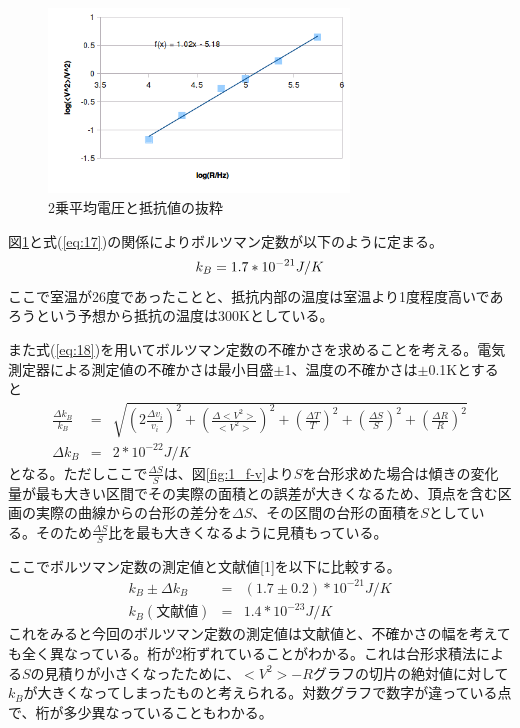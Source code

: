\documentclass[11pt,a4j]{jsarticle}
\begin{document}
   \begin{figure}[htbp]
  \centering
  \includegraphics[width=8cm,clip]{2_after.png}
  \caption{2乗平均電圧と抵抗値の抜粋}
  \label{fig:2_after}
 \end{figure}%
   
   図\ref{fig:2_after}と式(\ref{eq:17})の関係によりボルツマン定数が以下のように定まる。
   \begin{equation}
   k_B = 1.7 * 10^{-21} J/K \nonumber \\
   \end{equation}
   ここで室温が26度であったことと、抵抗内部の温度は室温より1度程度高いであろうという予想から抵抗の温度は300Kとしている。
   
   また式(\ref{eq:18})を用いてボルツマン定数の不確かさを求めることを考える。電気測定器による測定値の不確かさは最小目盛$\pm$1、温度の不確かさは$\pm$0.1Kとすると
   \begin{eqnarray}
   \frac{\Delta k_B}{k_B} &=& \sqrt{(2\frac{\Delta v_i}{v_i})^2 + (\frac{\Delta <V^2>}{<V^2>})^2 + (\frac{\Delta T}{T})^2 + (\frac{\Delta S}{S})^2 + (\frac{\Delta R}{R})^2} \nonumber \\
   \Delta k_B &=& 2 * 10^{-22} J/K \nonumber
   \end{eqnarray}
   となる。ただしここで$\frac{\Delta S}{S}$は、図\ref{fig:1_f-v}より$S$を台形求めた場合は傾きの変化量が最も大きい区間でその実際の面積との誤差が大きくなるため、頂点を含む区画の実際の曲線からの台形の差分を$\Delta S$、その区間の台形の面積を$S$としている。そのため$\frac{\Delta S}{S}$比を最も大きくなるように見積もっている。
   
   ここでボルツマン定数の測定値と文献値[1]を以下に比較する。
   \begin{eqnarray}
   k_B \pm \Delta k_B &=& (1.7 \pm 0.2) * 10^{-21} J/K \nonumber \\
   k_B(文献値) &=& 1.4 * 10^{-23} J/K \nonumber
   \end{eqnarray}
   これをみると今回のボルツマン定数の測定値は文献値と、不確かさの幅を考えても全く異なっている。桁が2桁ずれていることがわかる。これは台形求積法による$S$の見積りが小さくなったために、$<V^2> - R$グラフの切片の絶対値に対して$k_B$が大きくなってしまったものと考えられる。対数グラフで数字が違っている点で、桁が多少異なっていることもわかる。
   
\end{document}
